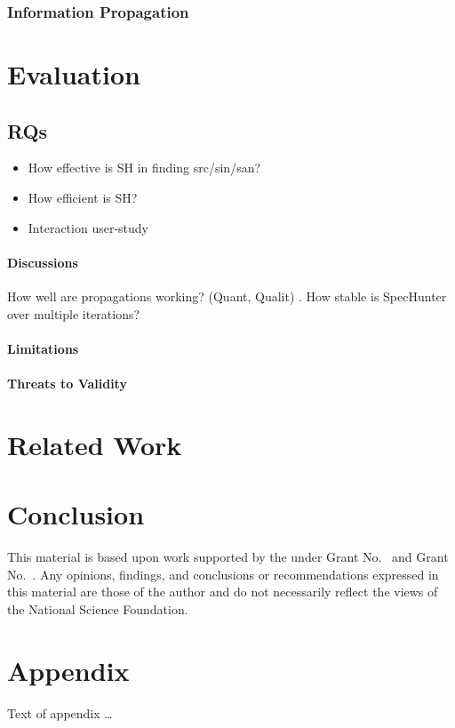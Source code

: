 \documentclass[sigconf,review,anonymous]{acmart}\settopmatter{printfolios=true,printccs=false,printacmref=false}
\begin{document}
\subsubsection{Information Propagation}


\section{Evaluation}

\subsection{RQs}
\begin{itemize}
\item How effective is SH in finding src/sin/san?  %
\item How efficient is SH?
\item Interaction user-study %
\end{itemize}


\paragraph{Discussions}
How well are propagations working? (Quant, Qualit) .
How stable is SpecHunter over multiple iterations?
\paragraph{Limitations}

\paragraph{Threats to Validity}


\section{Related Work}


\section{Conclusion}


\begin{acks}                            %
  This material is based upon work supported by the
   under Grant
  No.~ and Grant
  No.~. Any opinions, findings, and
  conclusions or recommendations expressed in this material are those
  of the author and do not necessarily reflect the views of the
  National Science Foundation.
\end{acks}


% 


\appendix
\section{Appendix}

Text of appendix \ldots
\end{document}
